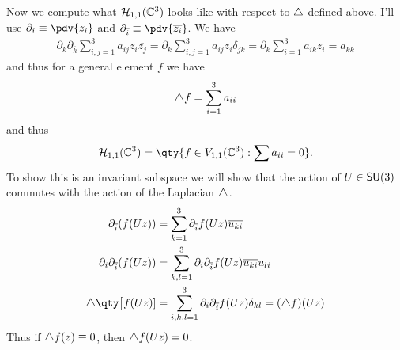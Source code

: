 \documentclass[
	pages,
	boxes,
	color=WildStrawberry
]{homework}
\theoremstyle{plain}
\begin{document}
\begin{solution}
	Now we compute what $\mathcal{H}_{1,1}(\mathbb{C}^3)$ looks like with respect to $\triangle$ defined above. I'll use $\partial_i\equiv \pdv{z_i}$ and $\partial_{\overline{i}}\equiv \pdv{\overline{z_i}}$. We have
	\begin{align*}
		\partial_k \partial_{\overline{k}}\sum_{i,j=1}^3 a_{ij}z_i\overline{z_j} = \partial_k \sum_{i,j=1}^3 a_{ij}z_i\delta_{jk} = \partial_k \sum_{i=1}^3a_{ik}z_i = a_{kk}
	\end{align*}
	and thus for a general element $f$ we have
	\begin{align*}
		\triangle{f} = \sum_{i=1}^3a_{ii}
	\end{align*}
	and thus
	\begin{equation*}
		\mathcal{H}_{1,1}(\C^3) = \qty{f\in V_{1,1}(\C^3) : \sum a_{ii} = 0}.
	\end{equation*}
	To show this is an invariant subspace we will show that the action of $U\in \mathsf{SU}(3)$ commutes with the action of the Laplacian $\triangle$.
	\begin{align*}
		\partial_{\overline{i}}(f(Uz))           & = \sum_{k = 1}^3 \partial_{\overline{i}}f(Uz)\overline{u_{ki}}                              \\
		\partial_i\partial_{\overline{i}}(f(Uz)) & = \sum_{k, l = 1}^3\partial_i\partial_{\overline{i}}f(Uz)\overline{u_{ki}}u_{li}            \\
		\laplace{\qty\big[f(Uz)]}                & = \sum_{i, k, l = 1}^3\partial_i\partial_{\overline{i}}f(Uz)\delta_{kl} = (\laplace{f})(Uz)
	\end{align*}
	Thus if $\triangle{f}(z)\equiv 0$, then $\triangle{f(Uz)} = 0$.


\end{solution}
\end{document}
